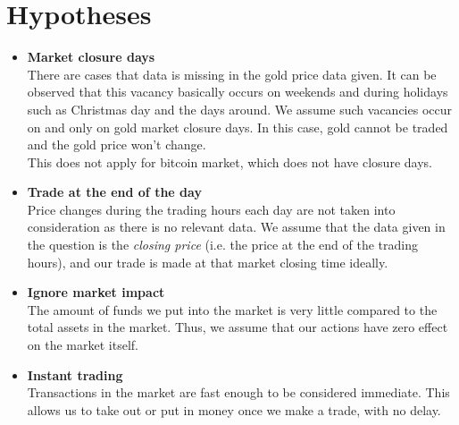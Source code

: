 \documentclass{mcmthesis}
\begin{document}
\section{Hypotheses}

\begin{itemize}
  \item \textbf{Market closure days}\\
  There are cases that data is missing in the gold price data given.
  It can be observed that this vacancy basically occurs on weekends
  and during holidays such as Christmas day and the days around.
  We assume such vacancies occur on and only on gold market closure days.
  In this case, gold cannot be traded and the gold price won't change.\\
  This does not apply for bitcoin market, which does not have closure days.
  \item \textbf{Trade at the end of the day}\\
  Price changes during the trading hours each day are not taken into consideration
  as there is no relevant data.
  We assume that the data given in the question is the \textit{closing price}
  (i.e. the price at the end of the trading hours),
  and our trade is made at that market closing time ideally.
  \item \textbf{Ignore market impact}\\
  The amount of funds we put into the market is very little
  compared to the total assets in the market.
  Thus, we assume that our actions have zero effect on the market itself.
  \item \textbf{Instant trading}\\
  Transactions in the market are fast enough to be considered immediate.
  This allows us to take out or put in money once we make a trade, with no delay.
\end{itemize}



\end{document}

